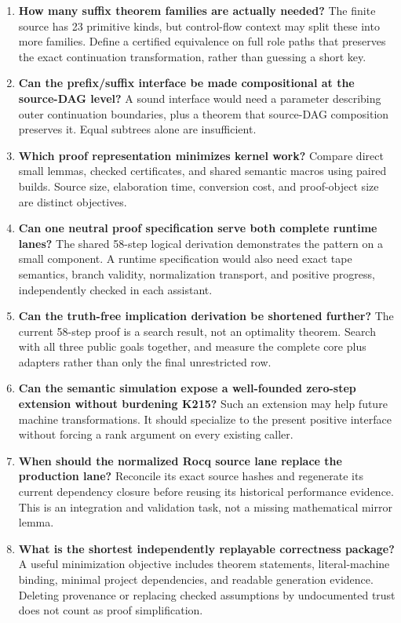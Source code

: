 \documentclass[11pt,letterpaper]{article}
\theoremstyle{definition}\newtheorem{definition}[theorem]{Definition}
\theoremstyle{remark}\newtheorem{remark}[theorem]{Remark}
\begin{document}
\begin{enumerate}
\item \textbf{How many suffix theorem families are actually needed?} The finite source has 23 primitive kinds, but control-flow context may split these into more families. Define a certified equivalence on full role paths that preserves the exact continuation transformation, rather than guessing a short key.
\item \textbf{Can the prefix/suffix interface be made compositional at the source-DAG level?} A sound interface would need a parameter describing outer continuation boundaries, plus a theorem that source-DAG composition preserves it. Equal subtrees alone are insufficient.
\item \textbf{Which proof representation minimizes kernel work?} Compare direct small lemmas, checked certificates, and shared semantic macros using paired builds. Source size, elaboration time, conversion cost, and proof-object size are distinct objectives.
\item \textbf{Can one neutral proof specification serve both complete runtime lanes?} The shared 58-step logical derivation demonstrates the pattern on a small component. A runtime specification would also need exact tape semantics, branch validity, normalization transport, and positive progress, independently checked in each assistant.
\item \textbf{Can the truth-free implication derivation be shortened further?} The current 58-step proof is a search result, not an optimality theorem. Search with all three public goals together, and measure the complete core plus adapters rather than only the final unrestricted row.
\item \textbf{Can the semantic simulation expose a well-founded zero-step extension without burdening K215?} Such an extension may help future machine transformations. It should specialize to the present positive interface without forcing a rank argument on every existing caller.
\item \textbf{When should the normalized Rocq source lane replace the production lane?} Reconcile its exact source hashes and regenerate its current dependency closure before reusing its historical performance evidence. This is an integration and validation task, not a missing mathematical mirror lemma.
\item \textbf{What is the shortest independently replayable correctness package?} A useful minimization objective includes theorem statements, literal-machine binding, minimal project dependencies, and readable generation evidence. Deleting provenance or replacing checked assumptions by undocumented trust does not count as proof simplification.
\end{enumerate}
\end{document}
